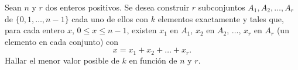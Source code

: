  Sean $n$ y $r$ dos enteros positivos. Se desea construir $r$ subconjuntos $A_1,A_2,\dots ,A_r$ de $\{0,1,\dots ,n-1\}$ cada uno de ellos con $k$ elementos exactamente y tales que, para cada entero $x$, $0\leq x\leq n-1$, existen $x_1$ en $A_1$, $x_2$ en $A_2$, $\dots$, $x_r$ en $A_r$ (un elemento en cada conjunto) con
\[x=x_1+x_2+\dots +x_r.\]
Hallar el menor valor posible de $k$ en función de $n$ y $r$. 